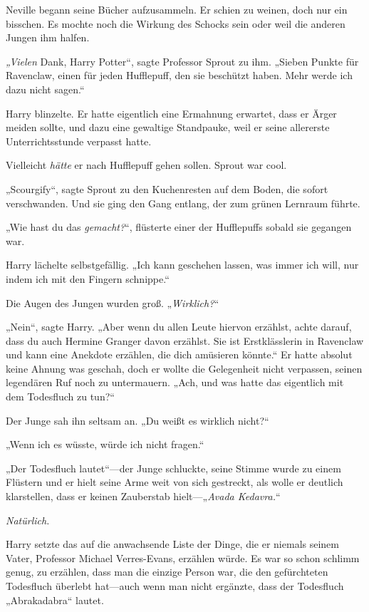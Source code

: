 {Neville begann seine Bücher aufzusammeln. Er schien zu weinen, doch nur ein bisschen. Es mochte noch die Wirkung des Schocks sein oder weil die anderen Jungen ihm halfen.

\emph{„Vielen} Dank, Harry Potter“, sagte Professor Sprout zu ihm. „Sieben Punkte für Ravenclaw, einen für jeden Hufflepuff, den sie beschützt haben. Mehr werde ich dazu nicht sagen.“

Harry blinzelte. Er hatte eigentlich eine Ermahnung erwartet, dass er Ärger meiden sollte, und dazu eine gewaltige Standpauke, weil er seine allererste Unterrichtsstunde verpasst hatte.

Vielleicht \emph{hätte} er nach Hufflepuff gehen sollen. Sprout war cool.

„Scourgify“, sagte Sprout zu den Kuchenresten auf dem Boden, die sofort verschwanden. Und sie ging den Gang entlang, der zum grünen Lernraum führte.

„Wie hast du das \emph{gemacht?}“, flüsterte einer der Hufflepuffs sobald sie gegangen war.

Harry lächelte selbstgefällig. „Ich kann geschehen lassen, was immer ich will, nur indem ich mit den Fingern schnippe.“

Die Augen des Jungen wurden groß. „\emph{Wirklich?}“

„Nein“, sagte Harry. „Aber wenn du allen Leute hiervon erzählst, achte darauf, dass du auch Hermine Granger davon erzählst. Sie ist Erstklässlerin in Ravenclaw und kann eine Anekdote erzählen, die dich amüsieren könnte.“ Er hatte absolut keine Ahnung was geschah, doch er wollte die Gelegenheit nicht verpassen, seinen legendären Ruf noch zu untermauern. „Ach, und was hatte das eigentlich mit dem Todesfluch zu tun?“

Der Junge sah ihn seltsam an. „Du weißt es wirklich nicht?“

„Wenn ich es wüsste, würde ich nicht fragen.“

„Der Todesfluch lautet“—der Junge schluckte, seine Stimme wurde zu einem Flüstern und er hielt seine Arme weit von sich gestreckt, als wolle er deutlich klarstellen, dass er keinen Zauberstab hielt—„\emph{Avada Kedavra.}“

\emph{Natürlich.}

Harry setzte das auf die anwachsende Liste der Dinge, die er niemals seinem Vater, Professor Michael Verres-Evans, erzählen würde. Es war so schon schlimm genug, zu erzählen, dass man die einzige Person war, die den gefürchteten Todesfluch überlebt hat—auch wenn man nicht ergänzte, dass der Todesfluch „Abrakadabra“ lautet.

}
